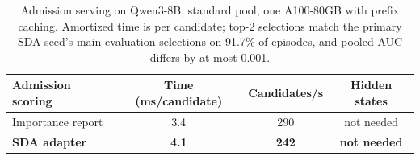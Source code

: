 \begin{table}[t]
\centering
\caption{Admission serving on Qwen3-8B, standard pool, one A100-80GB with prefix caching. Amortized time is
per candidate; top-2 selections match the primary SDA seed's main-evaluation selections on 91.7\% of episodes,
and pooled AUC differs by at most 0.001.}
\label{tab:sdadeploy}
\small
\setlength{\tabcolsep}{4pt}
\begin{tabular}{lccc}
\toprule
Admission scoring & Time (ms/candidate) & Candidates/s & Hidden states \\
\midrule
Importance report & 3.4 & 290 & not needed \\
\textbf{SDA adapter} & \textbf{4.1} & \textbf{242} & \textbf{not needed} \\
\bottomrule
\end{tabular}

\end{table}
